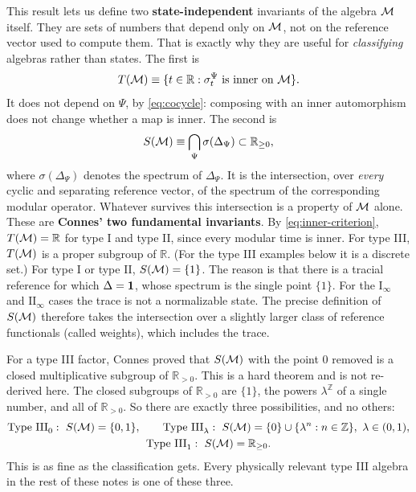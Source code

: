 This result lets us define two \textbf{state-independent} invariants of the algebra $\mathcal{M}$ itself. They are sets
of numbers that depend only on $\mathcal{M}$, not on the reference vector used to compute them. That is exactly why they
are useful for \emph{classifying} algebras rather than states. The first is
\[
T(\mathcal{M}) \equiv \{t\in\mathbb R : \sigma_t^\Psi \text{ is inner on } \mathcal{M}\} .
\]
It does not depend on $\Psi$, by \eqref{eq:cocycle}: composing with an inner automorphism does not change
whether a map is inner. The second is
\begin{equation}
S(\mathcal{M}) \equiv \bigcap_\Psi \sigma(\Delta_\Psi) \subset \mathbb R_{\ge0} ,
\label{eq:connes-S}
\end{equation}
where $\sigma(\Delta_\Psi)$ denotes the spectrum of $\Delta_\Psi$. It is the intersection, over \emph{every}
cyclic and separating reference vector, of the spectrum of the corresponding modular operator. Whatever
survives this intersection is a property of $\mathcal{M}$ alone. These are \textbf{Connes' two fundamental invariants}.
By \eqref{eq:inner-criterion}, $T(\mathcal{M})=\mathbb R$ for type I and type II, since every modular time is inner.
For type III, $T(\mathcal{M})$ is a proper subgroup of $\mathbb R$. (For the type III examples below it is a discrete
set.) For type I or type II, $S(\mathcal{M})=\{1\}$. The reason is that there is a tracial reference for which
$\Delta=\mathbf{1}$, whose spectrum is the single point $\{1\}$. For the $\mathrm{I}_\infty$ and $\mathrm{II}_\infty$
cases the trace is not a normalizable state. The precise definition of $S(\mathcal{M})$ therefore takes the
intersection over a slightly larger class of reference functionals (called weights), which includes the trace.

For a type III factor, Connes proved that $S(\mathcal{M})$ with the point $0$ removed is a closed multiplicative
subgroup of $\mathbb R_{>0}$. This is a hard theorem and is not re-derived here. The closed subgroups of
$\mathbb R_{>0}$ are $\{1\}$, the powers $\lambda^{\mathbb Z}$ of a single number, and all of $\mathbb R_{>0}$.
So there are exactly three possibilities, and no others:
\begin{gather}
\text{Type III}_0:\ S(\M)=\{0,1\}, \qquad
\text{Type III}_\lambda:\ S(\M)=\{0\}\cup\{\lambda^n : n\in\mathbb Z\},\ \lambda\in(0,1), \notag\\
\text{Type III}_1:\ S(\M)=\mathbb R_{\ge0} .
\label{eq:typeIII-classes}
\end{gather}
This is as fine as the classification gets. Every physically relevant type III algebra in the rest of these notes
is one of these three.

